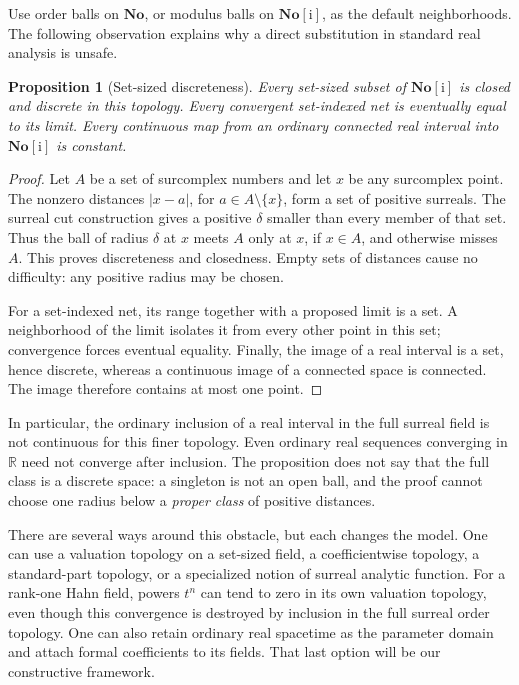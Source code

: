 \documentclass[11pt,letterpaper]{article}
\newcommand{\No}{\mathbf{No}}
\newcommand{\R}{\mathbb{R}}
\newcommand{\ii}{\mathrm{i}}
\newtheorem{proposition}{Proposition}[section]
\theoremstyle{definition}
\theoremstyle{remark}
\begin{document}
Use order balls on $\No$, or modulus balls on $\No[\ii]$, as the default
neighborhoods. The following observation explains why a direct substitution
in standard real analysis is unsafe.

\begin{proposition}[Set-sized discreteness]
\label{prop:discrete}
Every set-sized subset of $\No[\ii]$ is closed and discrete in this topology.
Every convergent set-indexed net is eventually equal to its limit. Every
continuous map from an ordinary connected real interval into $\No[\ii]$ is
constant.
\end{proposition}
\begin{proof}
Let $A$ be a set of surcomplex numbers and let $x$ be any surcomplex point.
The nonzero distances $|x-a|$, for $a\in A\setminus\{x\}$, form a set of
positive surreals. The surreal cut construction gives a positive $\delta$
smaller than every member of that set. Thus the ball of radius $\delta$ at
$x$ meets $A$ only at $x$, if $x\in A$, and otherwise misses $A$.
This proves discreteness and closedness. Empty sets of distances cause no
difficulty: any positive radius may be chosen.

For a set-indexed net, its range together with a proposed limit is a set.
A neighborhood of the limit isolates it from every other point in this set;
convergence forces eventual equality. Finally, the image of a real interval
is a set, hence discrete, whereas a continuous image of a connected space is
connected. The image therefore contains at most one point.
\end{proof}

In particular, the ordinary inclusion of a real interval in the full surreal
field is not continuous for this finer topology. Even ordinary real sequences
converging in $\R$ need not converge after inclusion. The proposition does not
say that the full class is a discrete space: a singleton is not an open ball,
and the proof cannot choose one radius below a \emph{proper class} of positive
distances.

There are several ways around this obstacle, but each changes the model. One
can use a valuation topology on a set-sized field, a coefficientwise topology,
a standard-part topology, or a specialized notion of surreal analytic function.
For a rank-one Hahn field, powers $t^n$ can tend to zero in its own valuation
topology, even though this convergence is destroyed by inclusion in the full
surreal order topology. One can also retain ordinary real spacetime as the
parameter domain and attach formal coefficients to its fields. That last
option will be our constructive framework.
\end{document}
